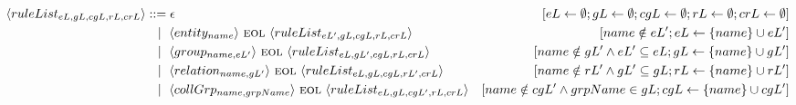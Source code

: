 \begin{landscape}
\begin{adjustbox}{max width=\linewidth,max height=.95\textheight,valign=c}
{\begin{align}
                \langle ruleList_{eL,gL,cgL,rL,crL} \rangle & ::= \epsilon                                                                                                                                                                                                                                                                                                                                                                                 & [eL \gets \emptyset; gL \gets \emptyset; cgL \gets \emptyset; rL \gets \emptyset; crL \gets \emptyset]            \label{meta:ruleList:1} \\
                                                            & ~~ \mid ~ \langle entity_{name}          \rangle ~\textsc{eol}~ \langle ruleList_{eL',gL,cgL,rL,crL} \rangle                                                                                                                                                                                                                                                                                 & [name \notin eL'; eL \gets \{name\} \cup eL']                                                                     \label{meta:ruleList:2} \\
                                                            & ~~ \mid ~ \langle group_{name, eL'}      \rangle ~\textsc{eol}~ \langle ruleList_{eL,gL',cgL,rL,crL} \rangle                                                                                                                                                                                                                                                                                 & [name \notin gL' \land eL' \subseteq eL; gL \gets \{name\} \cup gL']                                              \label{meta:ruleList:3} \\
                                                            & ~~ \mid ~ \langle relation_{name, gL'}   \rangle ~\textsc{eol}~ \langle ruleList_{eL,gL,cgL,rL',crL} \rangle                                                                                                                                                                                                                                                                                 & [name \notin rL' \land gL' \subseteq gL; rL \gets \{name\} \cup rL']                                              \label{meta:ruleList:4} \\
                                                            & ~~ \mid ~ \langle collGrp_{name,grpName} \rangle ~\textsc{eol}~ \langle ruleList_{eL,gL,cgL',rL,crL} \rangle                                                                                                                                                                                                                                                                                 & [name \notin cgL' \land grpName \in gL; cgL \gets \{name\} \cup cgL']                                             \label{meta:ruleList:5} \\

\end{align}}
\end{adjustbox}
\end{landscape}
